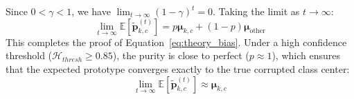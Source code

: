 \documentclass{article}
\theoremstyle{plain}
\theoremstyle{definition}
\theoremstyle{remark}
\begin{document}
Since $0 < \gamma < 1$, we have $\lim_{t \to \infty} (1-\gamma)^t = 0$. Taking the limit as $t \to \infty$:
\begin{equation}
    \lim_{t \to \infty} \mathbb{E}[\tilde{\boldsymbol{p}}_{k,c}^{(t)}] = p \boldsymbol{\mu}_{k,c} + (1-p) \boldsymbol{\mu}_{\text{other}}
\end{equation}
This completes the proof of Equation~\eqref{eq:theory_bias}. Under a high confidence threshold ($\mathcal{H}_{thresh} \ge 0.85$), the purity is close to perfect ($p \approx 1$), which ensures that the expected prototype converges exactly to the true corrupted class center:
\begin{equation}
    \lim_{t \to \infty} \mathbb{E}[\tilde{\boldsymbol{p}}_{k,c}^{(t)}] \approx \boldsymbol{\boldsymbol{\mu}}_{k,c}
\end{equation}
\end{document}
